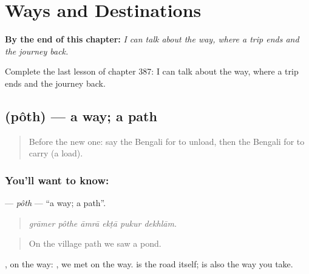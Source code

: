 
\chapter{Ways and Destinations}
\label{ch:bn-ways-and-destinations}

\begin{chapteropening}
\textbf{By the end of this chapter:} \emph{I can talk about the way, where a trip ends and the journey back.}

Complete the last lesson of chapter 387: I can talk about the way, where a trip ends and the journey back.
\end{chapteropening}

\section[\texorpdfstring{\bn{পথ} (pôth)}{পথ (pôth)}]{ (pôth) — a way; a path}

\label{lesson:BN-C387-poth}



\begin{quote}
Before the new one: say the Bengali for to unload, then the Bengali for to carry (a load).
\end{quote}

\subsection*{You'll want to know: }
\textbf{} — \emph{pôth} — \textquotedblleft{}a way; a path\textquotedblright{}.

\begin{quote}
     
\end{quote}

\begin{quote}
\emph{grāmer pôthe āmrā ekṭā pukur dekhlām.}
\end{quote}

\begin{quote}
On the village path we saw a pond.
\end{quote}

, on the way:   , we met on the way.  is the road itself;  is also the way you take.


